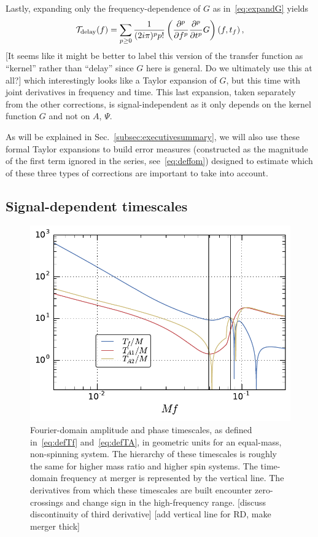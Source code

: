 \documentclass[aps,showpacs,twocolumn,
prd,superscriptaddress,nofootinbib]{revtex4-1}
\newcommand{\be}{\begin{equation}}
\newcommand{\ee}{\end{equation}}
\newcommand\calT{{\mathcal{T}}}
\newcommand{\tf}{t_{f}}
\newcommand{\SM}[1]{{\color{Red} #1}}
\newcommand{\jgb}[1]{{\color{DarkGreen} #1}}
\begin{document}
Lastly, expanding only the frequency-dependence of $G$ as in~\eqref{eq:expandG} yields
\be\label{eq:resulttaylordelay}
	\calT_{\rm delay}(f) = \sum\limits_{p\geq 0} \frac{1}{(2i\pi)^{p}p!} \left( \frac{\partial^{p} }{\partial f^{p}} \frac{\partial^{p} }{\partial t^{p}} G \right)(f,\tf) \,,
\ee
\jgb{[It seems like it might be better to label this version of the transfer function as ``kernel'' rather than ``delay'' since $G$ here is general. Do we ultimately use this at all?]}
which interestingly looks like a Taylor expansion of $G$, but this time with joint derivatives in frequency and time. This last expansion, taken separately from the other corrections, is signal-independent as it only depends on the kernel function $G$ and not on $A$, $\Psi$.

As will be explained in Sec.~\ref{subsec:executivesummary}, we will also use these formal Taylor expansions to build error measures (constructed as the magnitude of the first term ignored in the series, see~\eqref{eq:deffom}) designed to estimate which of these three types of corrections are important to take into account.


\subsection{Signal-dependent timescales}
\label{subsec:timescales}

\begin{figure}
  \centering
  \includegraphics[width=.98\linewidth]{plots/TfTA_py.pdf}
  \caption{Fourier-domain amplitude and phase timescales, as defined in~\eqref{eq:defTf} and~\eqref{eq:defTA}, in geometric units for an equal-mass, non-spinning system. The hierarchy of these timescales is roughly the same for higher mass ratio and higher spin systems. The time-domain frequency at merger is represented by the vertical line. The derivatives from which these timescales are built encounter zero-crossings and change sign in the high-frequency range. \SM{[discuss discontinuity of third derivative]}\SM{[add vertical line for RD, make merger thick]}}
  \label{fig:TfTA}
\end{figure}
\end{document}
